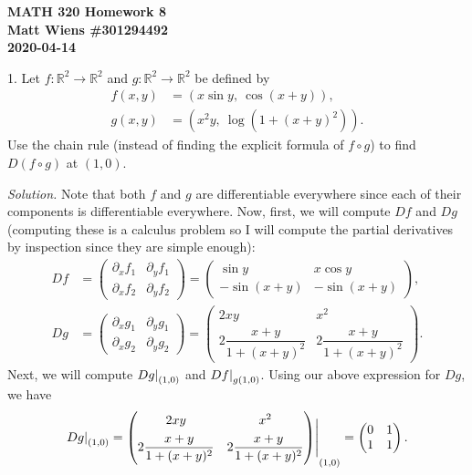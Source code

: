 \documentclass{article}
\newcommand{\0}{\mathbf{0}}
\newcommand{\R}{\mathbb{R}}
\begin{document}
\textbf{MATH 320 Homework 8} \\
\textbf{Matt Wiens \#301294492} \\
\textbf{2020-04-14}

1. Let $f: \R^2 \to \R^2$ and $g: \R^2 \to \R^2$ be defined by
%
\begin{align*}
    f(x, y) &= (x \sin y, \ \cos(x+y)), \\
    g(x, y) &= (x^2 y, \ \log (1+(x+y)^2))
    .
\end{align*}
%
Use the chain rule (instead of finding the explicit formula of $f \circ
g$) to find $D(f \circ g)$ at $(1, 0)$.

\textit{Solution.}
Note that both $f$ and $g$ are differentiable everywhere since each of
their components is differentiable everywhere. Now, first, we will
compute $D f$ and $D g$ (computing these is a calculus problem so I will
compute the partial derivatives by inspection since they are simple
enough):
%
\begin{align*}
    D f
    &=
        \begin{pmatrix}
            \partial_x f_1 & \partial_y f_1 \\
            \partial_x f_2 & \partial_y f_2
        \end{pmatrix}
    =
        \begin{pmatrix}
            \sin y & x \cos y \\
            - \sin(x + y) & - \sin(x + y)
        \end{pmatrix}
        ,
    \\
    D g
    &=
        \begin{pmatrix}
            \partial_x g_1 & \partial_y g_1 \\
            \partial_x g_2 & \partial_y g_2
        \end{pmatrix}
    =
        \begin{pmatrix}
            2 x y & x^2 \\[5pt]
            2 \dfrac{x + y}{1 + (x + y)^2} & 2 \dfrac{x + y}{1 + (x + y)^2}
        \end{pmatrix}
        .
\end{align*}
%
Next, we will compute $\eval[0]{D g}_{(1, 0)}$ and $\eval[0]{D f}_{g(1,
0)}$. Using our above expression for $D g$, we have
%
\begin{equation*}
    \eval[0]{D g}_{(1, 0)}
    =
    \eval{
        \begin{pmatrix}
            2 x y & x^2 \\[5pt]
            2 \dfrac{x + y}{1 + (x + y)^2} & 2 \dfrac{x + y}{1 + (x + y)^2}
        \end{pmatrix}
    }_{(1, 0)}
    =
        \begin{pmatrix}
            0 & 1 \\
            1 & 1
        \end{pmatrix}
    .
\end{equation*}
\end{document}

